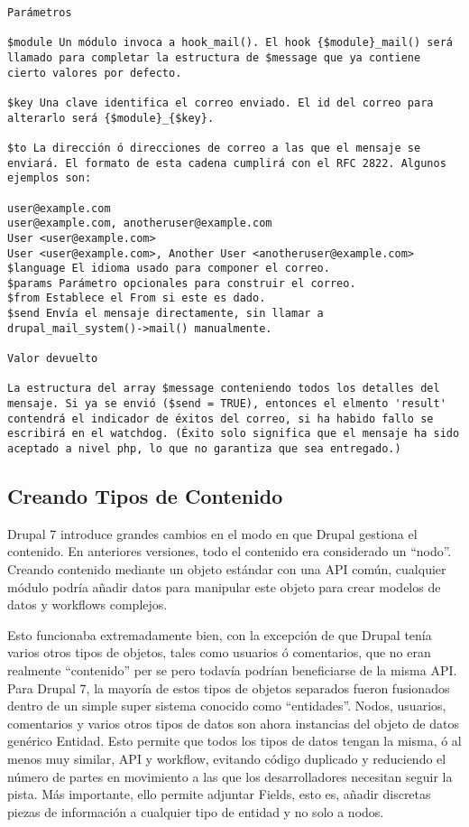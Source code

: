 \documentclass[11pt]{article}
\begin{document}
{{\begin{verbatim}
Parámetros 

$module Un módulo invoca a hook_mail(). El hook {$module}_mail() será
llamado para completar la estructura de $message que ya contiene
cierto valores por defecto.

$key Una clave identifica el correo enviado. El id del correo para
alterarlo será {$module}_{$key}.

$to La dirección ó direcciones de correo a las que el mensaje se
enviará. El formato de esta cadena cumplirá con el RFC 2822. Algunos
ejemplos son:

user@example.com 
user@example.com, anotheruser@example.com 
User <user@example.com> 
User <user@example.com>, Another User <anotheruser@example.com> 
$language El idioma usado para componer el correo.
$params Parámetro opcionales para construir el correo.
$from Establece el From si este es dado.
$send Envía el mensaje directamente, sin llamar a
drupal_mail_system()->mail() manualmente.

Valor devuelto

La estructura del array $message conteniendo todos los detalles del
mensaje. Si ya se envió ($send = TRUE), entonces el elmento 'result'
contendrá el indicador de éxitos del correo, si ha habido fallo se
escribirá en el watchdog. (Éxito solo significa que el mensaje ha sido
aceptado a nivel php, lo que no garantiza que sea entregado.)
\end{verbatim}



\subsection{Creando Tipos de Contenido}
\label{sec-4.15}


Drupal 7 introduce grandes cambios en el modo en que Drupal gestiona
el contenido. En anteriores versiones, todo el contenido era
considerado un “nodo”. Creando contenido mediante un objeto estándar
con una API común, cualquier módulo podría añadir datos para manipular
este objeto para crear modelos de datos y workflows complejos.

Esto funcionaba extremadamente bien, con la excepción de que Drupal
tenía varios otros tipos de objetos, tales como usuarios ó
comentarios, que no eran realmente “contenido” per se pero todavía
podrían beneficiarse de la misma API. Para Drupal 7, la mayoría de
estos tipos de objetos separados fueron fusionados dentro de un simple
super sistema conocido como “entidades”. Nodos, usuarios, comentarios
y varios otros tipos de datos son ahora instancias del objeto de datos
genérico Entidad. Esto permite que todos los tipos de datos tengan la
misma, ó al menos muy similar, API y workflow, evitando código
duplicado y reduciendo el número de partes en movimiento a las que los
desarrolladores necesitan seguir la pista. Más importante, ello
permite adjuntar Fields, esto es, añadir discretas piezas de
información a cualquier tipo de entidad y no solo a nodos.

}}
\end{document}
